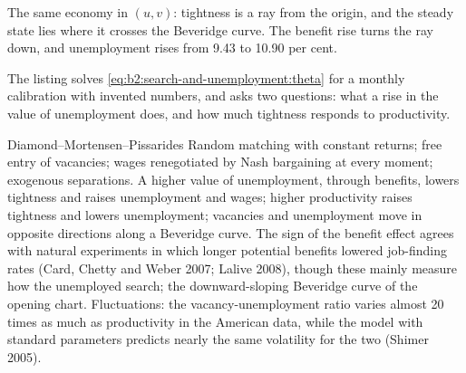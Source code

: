 \begin{omfigure}

{\small The same economy in $(u, v)$: tightness is a ray from the origin, and the steady state lies where it crosses the Beveridge curve. The benefit
rise turns the ray down, and unemployment rises from 9.43 to 10.90 per cent.}
\end{omfigure}

The listing solves \eqref{eq:b2:search-and-unemployment:theta} for a monthly calibration with invented numbers, and asks two questions: what a rise in the value of unemployment does,
and how much tightness responds to productivity.

\label{lst:b2:search-and-unemployment:dmp}

\label{out:b2:search-and-unemployment:dmp}

\begin{model}{Diamond--Mortensen--Pissarides}
\assumes Random matching with constant returns; free entry of vacancies; wages renegotiated by Nash bargaining at every
moment; exogenous separations.
\predicts A higher value of unemployment, through benefits, lowers tightness and raises unemployment and wages; higher
productivity raises tightness and lowers unemployment; vacancies and unemployment move in opposite directions along a
Beveridge curve.
\tested The sign of the benefit effect agrees with natural experiments in which longer potential benefits lowered
job-finding rates (Card, Chetty and Weber 2007; Lalive 2008), though these mainly measure how the unemployed search; the
downward-sloping Beveridge curve of the opening chart.
\breaks Fluctuations: the vacancy-unemployment ratio varies almost 20 times as much as productivity in the American data, while the
model with standard parameters predicts nearly the same volatility for the two (Shimer 2005).
\end{model}

